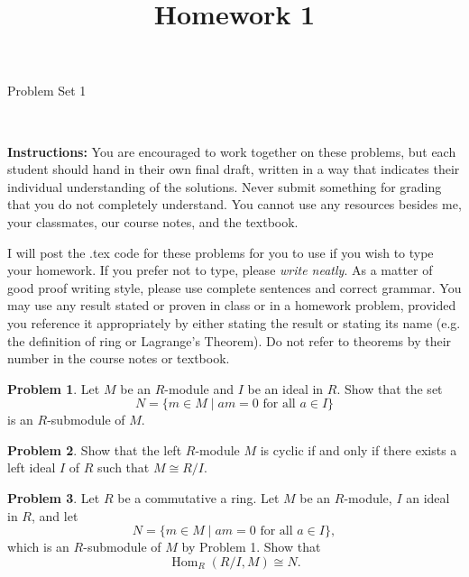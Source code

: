 \documentclass[11pt]{article}
\title{}
\date{\vspace{-0.5in}}
\title{Homework 1}
\DeclareMathOperator{\Hom}{Hom}
\theoremstyle{definition}
\newtheorem{problem}{Problem}
\begin{document}
\thispagestyle{fancy}
\pagestyle{fancy}

\vspace{3em}

\begin{center}
	{\LARGE Problem Set 1}
\end{center}

\

\noindent
{\bf Instructions:}
You are encouraged to work together on these problems, but each student should hand in their own final draft, written in a way that indicates their individual understanding of the solutions. Never submit something for grading that you do not completely understand. You cannot use any resources besides me, your classmates, our course notes, and the textbook.


I will post the .tex code for these problems for you to use if you wish to type your homework. If you prefer not to type, please  {\em write neatly}. As a matter of good proof writing style, please use complete sentences and correct grammar. You may use any result  stated or proven in class or in a homework problem, provided you reference it appropriately by either stating the result or stating its name (e.g. the definition of ring or Lagrange's Theorem). Do not refer to theorems by their number in the course notes or textbook.


\vspace{2em}




\begin{problem}
Let $M$ be an $R$-module and $I$ be an ideal in $R$. Show that the set
$$N = \{ m \in M \mid am = 0 \textrm{ for all } a \in I \}$$
is an $R$-submodule of $M$.
\end{problem}




\begin{problem}
Show that the left $R$-module $M$ is cyclic if and only if there exists a left ideal $I$ of $R$ such that $M \cong R/I$.
\end{problem}




\begin{problem}
Let $R$ be a commutative a ring.
Let $M$ be an $R$-module, $I$ an ideal in $R$, and let
$$N = \{ m \in M \mid am = 0 \textrm{ for all } a \in I \},$$
which is an $R$-submodule of $M$ by Problem 1. Show that
$$\Hom_R(R/I,M) \cong N.$$
\end{problem}
\end{document}
